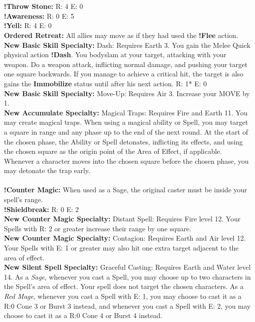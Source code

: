 %
\\\\
%
 \ofrow 
\textbf{!Throw Stone:} R: 4 E: 0\\
\textbf{!Awareness:} R: 0 E: 5\\
\textbf{!Yell:} R: 4 E: 0\\
\textbf{Ordered Retreat:} All allies may move as if they had used the \textbf{!Flee} action.\\
\textbf{New Basic Skill Specialty:} Dash: Requires Earth 3. You gain the Melee Quick physical action \textbf{!Dash}. You bodyslam at your target, attacking with your weapon. Do a weapon attack, inflicting normal damage, and pushing your target one square backwards. If you manage to achieve a critical hit, the target is also gains the \textbf{Immobilize} status until after his next action. R: 1* E: 0\\
\textbf{New Basic Skill Specialty:} Move-Up: Requires Air 3. Increase your MOVE by 1.\\
\textbf{New Accumulate Specialty:} Magical Traps: Requires Fire and Earth 11. You may create magical traps. When using a magical ability or Spell, you may target a square in range and any phase up to the end of the next round. At the start of the chosen phase, the Ability or Spell detonates, inflicting its effects, and using the chosen square as the origin point of the Area of Effect, if applicable. Whenever a character moves into the chosen square before the chosen phase, you may detonate the trap early.
%
\\\\
%
 \ofrow 
\textbf{!Counter Magic:} When used as a Sage, the original caster must be inside your spell's range.\\
\textbf{!Shieldbreak:} R: 0 E: 2\\
\textbf{New Counter Magic Specialty:} Distant Spell: Requires Fire level 12. Your Spells with R: 2 or greater increase their range by one square.\\
\textbf{New Counter Magic Specialty:} Contagion: Requires Earth and Air level 12. Your Spells with E: 1 or greater may also hit one extra target adjacent to the area of effect.\\
\textbf{New Silent Spell Specialty:} Graceful Casting: Requires Earth and Water level 14. As a \textit{Sage}, whenever you cast a Spell, you may choose up to two characters in the Spell's area of effect. Your spell does not target the chosen characters. As a \textit{Red Mage}, whenever you cast a Spell with E: 1, you may choose to cast it as a R:0 Cone 3 or Burst 3 instead, and whenever you cast a Spell with E: 2, you may choose to cast it as a R:0 Cone 4 or Burst 4 instead.

